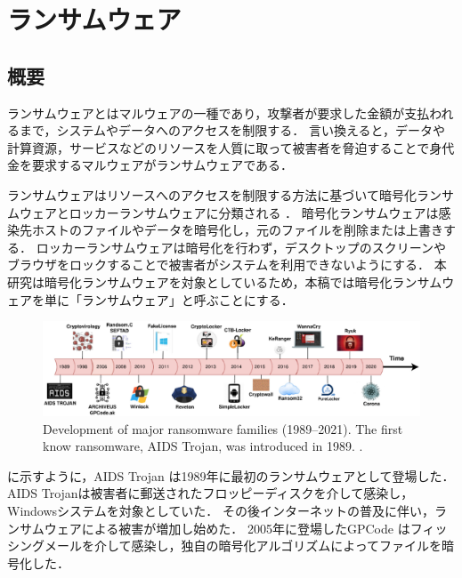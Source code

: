 \chapter{ランサムウェア}

\section{概要}
\label{sec:ransom-overview}
ランサムウェアとはマルウェアの一種であり，攻撃者が要求した金額が支払われるまで，システムやデータへのアクセスを制限する．
言い換えると，データや計算資源，サービスなどのリソースを人質に取って被害者を脅迫することで身代金を要求するマルウェアがランサムウェアである．

ランサムウェアはリソースへのアクセスを制限する方法に基づいて暗号化ランサムウェアとロッカーランサムウェアに分類される \cite{oz2022survey}．
暗号化ランサムウェアは感染先ホストのファイルやデータを暗号化し，元のファイルを削除または上書きする．
ロッカーランサムウェアは暗号化を行わず，デスクトップのスクリーンやブラウザをロックすることで被害者がシステムを利用できないようにする．
本研究は暗号化ランサムウェアを対象としているため，本稿では暗号化ランサムウェアを単に「ランサムウェア」と呼ぶことにする．

\begin{figure}[t]
  \begin{center}
    \includegraphics[width=\columnwidth]{doc/img/ransom-evolution.eps}
  \end{center}
  \caption{Development of major ransomware families (1989–2021). The first know ransomware, AIDS Trojan, was introduced in 1989. \cite{Evolution-Ransomware}.}
  \label{fig:ransom-evolution}
\end{figure}

に示すように，AIDS Trojan \cite{aids-trojan} は1989年に最初のランサムウェアとして登場した．
AIDS Trojanは被害者に郵送されたフロッピーディスクを介して感染し，Windowsシステムを対象としていた．
その後インターネットの普及に伴い，ランサムウェアによる被害が増加し始めた．
2005年に登場したGPCode \cite{PGPCoder42:online} はフィッシングメールを介して感染し，独自の暗号化アルゴリズムによってファイルを暗号化した．

